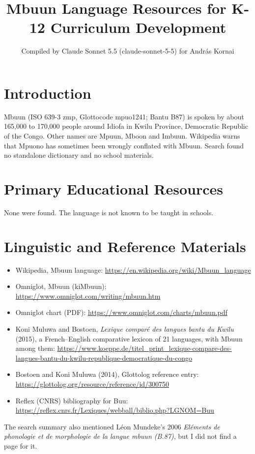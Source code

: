 \documentclass[12pt]{article}
\title{Mbuun Language Resources for K-12 Curriculum Development}
\author{Compiled by Claude Sonnet 5.5 (claude-sonnet-5-5) for Andr\'as Kornai}
\date{}
\begin{document}
\maketitle

\section{Introduction}
Mbuun (ISO 639-3 zmp, Glottocode mpuo1241; Bantu B87) is spoken by about 165,000 to 170,000 people around Idiofa in Kwilu Province, Democratic Republic of the Congo. Other names are Mpuun, Mboon and Imbuun. Wikipedia warns that Mpuono has sometimes been wrongly conflated with Mbuun. Search found no standalone dictionary and no school materials.

\section{Primary Educational Resources}
None were found. The language is not known to be taught in schools.

\section{Linguistic and Reference Materials}
\begin{itemize}
\item Wikipedia, Mbuun language: \url{https://en.wikipedia.org/wiki/Mbuun_language}
\item Omniglot, Mbuun (kiMbuun): \url{https://www.omniglot.com/writing/mbuun.htm}
\item Omniglot chart (PDF): \url{https://www.omniglot.com/charts/mbuun.pdf}
\item Koni Muluwa and Bostoen, \emph{Lexique compar\'e des langues bantu du Kwilu} (2015), a French--English comparative lexicon of 21 languages, with Mbuun among them: \url{https://www.koeppe.de/titel_print_lexique-compare-des-langues-bantu-du-kwilu-republique-democratique-du-congo}
\item Bostoen and Koni Muluwa (2014), Glottolog reference entry: \url{https://glottolog.org/resource/reference/id/300750}
\item Reflex (CNRS) bibliography for Buu: \url{https://reflex.cnrs.fr/Lexiques/webball/biblio.php?LGNOM=Buu}
\end{itemize}
The search summary also mentioned L\'eon Mundeke's 2006 \emph{El\'ements de phonologie et de morphologie de la langue mbuun (B.87)}, but I did not find a page for it.
\end{document}
